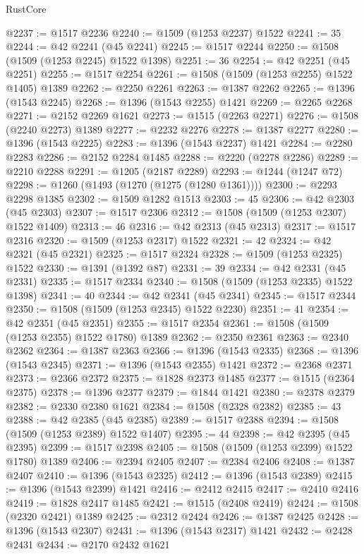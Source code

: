 \begin{lexlean}{RustCore}
\begin{coremodule}
@2237 := @1517 @2236
@2240 := @1509 (@1253 @2237) @1522
@2241 := 35
@2244 := @42 @2241 (@45 @2241)
@2245 := @1517 @2244
@2250 := @1508 (@1509 (@1253 @2245) @1522 @1398)
@2251 := 36
@2254 := @42 @2251 (@45 @2251)
@2255 := @1517 @2254
@2261 := @1508 (@1509 (@1253 @2255) @1522 @1405) @1389
@2262 := @2250 @2261
@2263 := @1387 @2262
@2265 := @1396 (@1543 @2245)
@2268 := @1396 (@1543 @2255) @1421
@2269 := @2265 @2268
@2271 := @2152 @2269 @1621
@2273 := @1515 (@2263 @2271)
@2276 := @1508 (@2240 @2273) @1389
@2277 := @2232 @2276
@2278 := @1387 @2277
@2280 := @1396 (@1543 @2225)
@2283 := @1396 (@1543 @2237) @1421
@2284 := @2280 @2283
@2286 := @2152 @2284 @1485
@2288 := @2220 (@2278 @2286)
@2289 := @2210 @2288
@2291 := @1205 (@2187 @2289)
@2293 := @1244 (@1247 @72)
@2298 := @1260 (@1493 (@1270 (@1275 (@1280 @1361))))
@2300 := @2293 @2298 @1385
@2302 := @1509 @1282 @1513
@2303 := 45
@2306 := @42 @2303 (@45 @2303)
@2307 := @1517 @2306
@2312 := @1508 (@1509 (@1253 @2307) @1522 @1409)
@2313 := 46
@2316 := @42 @2313 (@45 @2313)
@2317 := @1517 @2316
@2320 := @1509 (@1253 @2317) @1522
@2321 := 42
@2324 := @42 @2321 (@45 @2321)
@2325 := @1517 @2324
@2328 := @1509 (@1253 @2325) @1522
@2330 := @1391 (@1392 @87)
@2331 := 39
@2334 := @42 @2331 (@45 @2331)
@2335 := @1517 @2334
@2340 := @1508 (@1509 (@1253 @2335) @1522 @1398)
@2341 := 40
@2344 := @42 @2341 (@45 @2341)
@2345 := @1517 @2344
@2350 := @1508 (@1509 (@1253 @2345) @1522 @2230)
@2351 := 41
@2354 := @42 @2351 (@45 @2351)
@2355 := @1517 @2354
@2361 := @1508 (@1509 (@1253 @2355) @1522 @1780) @1389
@2362 := @2350 @2361
@2363 := @2340 @2362
@2364 := @1387 @2363
@2366 := @1396 (@1543 @2335)
@2368 := @1396 (@1543 @2345)
@2371 := @1396 (@1543 @2355) @1421
@2372 := @2368 @2371
@2373 := @2366 @2372
@2375 := @1828 @2373 @1485
@2377 := @1515 (@2364 @2375)
@2378 := @1396 @2377
@2379 := @1844 @1421
@2380 := @2378 @2379
@2382 := @2330 @2380 @1621
@2384 := @1508 (@2328 @2382)
@2385 := 43
@2388 := @42 @2385 (@45 @2385)
@2389 := @1517 @2388
@2394 := @1508 (@1509 (@1253 @2389) @1522 @1407)
@2395 := 44
@2398 := @42 @2395 (@45 @2395)
@2399 := @1517 @2398
@2405 := @1508 (@1509 (@1253 @2399) @1522 @1780) @1389
@2406 := @2394 @2405
@2407 := @2384 @2406
@2408 := @1387 @2407
@2410 := @1396 (@1543 @2325)
@2412 := @1396 (@1543 @2389)
@2415 := @1396 (@1543 @2399) @1421
@2416 := @2412 @2415
@2417 := @2410 @2416
@2419 := @1828 @2417 @1485
@2421 := @1515 (@2408 @2419)
@2424 := @1508 (@2320 @2421) @1389
@2425 := @2312 @2424
@2426 := @1387 @2425
@2428 := @1396 (@1543 @2307)
@2431 := @1396 (@1543 @2317) @1421
@2432 := @2428 @2431
@2434 := @2170 @2432 @1621

\end{coremodule}
\end{lexlean}
